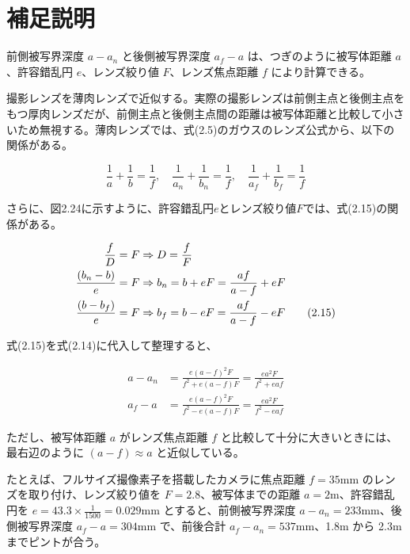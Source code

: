 \documentclass{jsarticle}
\begin{document}
\section*{補足説明}

前側被写界深度 $a - a_n$ と後側被写界深度 $a_f - a$ は、つぎのように被写体距離 $a$、許容錯乱円 $e$、レンズ絞り値 $F$、レンズ焦点距離 $f$ により計算できる。

撮影レンズを薄肉レンズで近似する。実際の撮影レンズは前側主点と後側主点をもつ厚肉レンズだが、前側主点と後側主点間の距離は被写体距離と比較して小さいため無視する。薄肉レンズでは、式(2.5)のガウスのレンズ公式から、以下の関係がある。

\begin{equation}
\frac{1}{a} + \frac{1}{b} = \frac{1}{f}, \quad
\frac{1}{a_n} + \frac{1}{b_n} = \frac{1}{f}, \quad
\frac{1}{a_f} + \frac{1}{b_f} = \frac{1}{f}
\tag{2.14}
\end{equation}

さらに、図2.24に示すように、許容錯乱円$e$とレンズ絞り値$F$では、式(2.15)の関係がある。


\begin{align}
\frac{f}{D} = F &\Rightarrow D = \frac{f}{F} \notag \\
\frac{(b_n - b)}{e} = F &\Rightarrow b_n = b + eF = \frac{af}{a - f} + eF \notag \\
\frac{(b - b_f)}{e} = F &\Rightarrow b_f = b - eF = \frac{af}{a - f} - eF
\tag{2.15}
\end{align}

式(2.15)を式(2.14)に代入して整理すると、

\begin{align}
a - a_n &= \frac{e(a - f)^2 F}{f^2 + e(a - f)F} = \frac{ea^2 F}{f^2 + eaf} \tag{2.16} \\
a_f - a &= \frac{e(a - f)^2 F}{f^2 - e(a - f)F} = \frac{ea^2 F}{f^2 - eaf} \tag{2.17}
\end{align}

ただし、被写体距離 $a$ がレンズ焦点距離 $f$ と比較して十分に大きいときには、最右辺のように $(a - f) \approx a$ と近似している。

たとえば、フルサイズ撮像素子を搭載したカメラに焦点距離 $f = 35$mm のレンズを取り付け、レンズ絞り値を $F = 2.8$、被写体までの距離 $a = 2$m、許容錯乱円を $e = 43.3 \times \frac{1}{1500} = 0.029$mm とすると、前側被写界深度 $a - a_n = 233$mm、後側被写界深度 $a_f - a = 304$mm で、前後合計 $a_f - a_n = 537$mm、1.8m から 2.3m までピントが合う。
\end{document}
